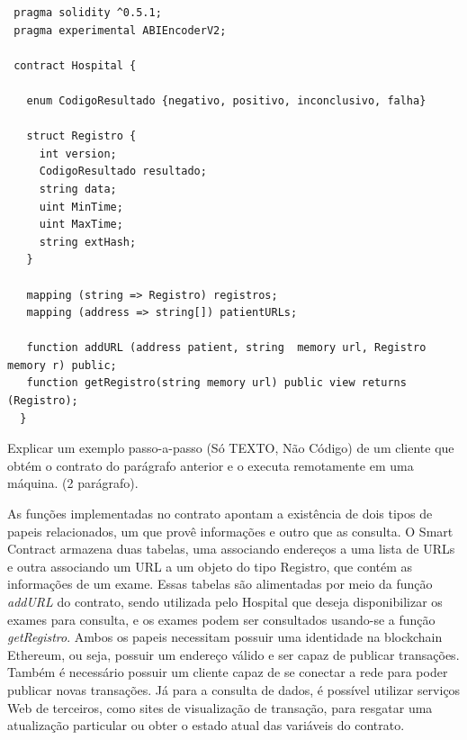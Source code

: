 \documentclass[a4paper,11pt]{article}
\begin{document}
\begin{lstlisting}
 pragma solidity ^0.5.1;
 pragma experimental ABIEncoderV2;

 contract Hospital {

   enum CodigoResultado {negativo, positivo, inconclusivo, falha}

   struct Registro {
     int version;
     CodigoResultado resultado;
     string data;
     uint MinTime;
     uint MaxTime;
     string extHash;
   }

   mapping (string => Registro) registros;
   mapping (address => string[]) patientURLs;

   function addURL (address patient, string  memory url, Registro memory r) public;
   function getRegistro(string memory url) public view returns (Registro);
  }
\end{lstlisting}

{\color{ForestGreen}Explicar um exemplo passo-a-passo (Só TEXTO, Não Código) de um cliente que obtém o contrato do parágrafo anterior e o executa remotamente em uma máquina. (2 parágrafo).}

As funções implementadas no contrato apontam a existência de dois tipos de papeis relacionados, um que provê informações e outro que as consulta. O Smart Contract armazena duas tabelas, uma associando endereços a uma lista de URLs e outra associando um URL a um objeto do tipo Registro, que contém as informações de um exame. Essas tabelas são alimentadas por meio da função \emph{addURL} do contrato, sendo utilizada pelo Hospital que deseja disponibilizar os exames para consulta, e os exames podem ser consultados usando-se a função \emph{getRegistro}. Ambos os papeis necessitam possuir uma identidade na blockchain Ethereum, ou seja, possuir um endereço válido e ser capaz de publicar transações. Também é necessário possuir um cliente capaz de se conectar a rede para poder publicar novas transações. Já para a consulta de dados, é possível utilizar serviços Web de terceiros, como sites de visualização de transação, para resgatar uma atualização particular ou obter o estado atual das variáveis do contrato.
\end{document}
